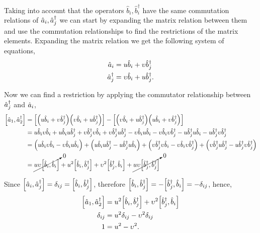 \documentclass[../main.tex]{subfiles}
\begin{document}
Taking into account that the operators $\hat{b}_i, \hat{b}^\dagger_i$ have the same commutation relations of $\hat{a}_i,\hat{a}^\dagger_j$ we can start by expanding the matrix relation between them and use the commutation relationships to find the restrictions of the matrix elements.
Expanding the matrix relation we get the following system of equations,
\begin{align*}
    \hat{a}_i &= u\hat{b}_i + \upsilon\hat{b}^\dagger_j \\
    \hat{a}^\dagger_j &= \upsilon\hat{b}_i + u\hat{b}^\dagger_j .
\end{align*}

Now we can find a restriction by applying the commutator relationship between $\hat{a}^\dagger_j$ and $\hat{a}_i$,
\begin{align*}
    \commutator{\hata_1}{\hatad_2} &=  \qty[\qty(u\hat{b}_i + \upsilon\hat{b}^\dagger_j)\qty(\upsilon\hat{b}_i + u\hat{b}^\dagger_j)] - \qty[\qty(\upsilon\hat{b}_i + u\hat{b}^\dagger_j)\qty(u\hat{b}_i + \upsilon\hat{b}^\dagger_j)] \\
    &=  u\hat{b}_i\upsilon\hat{b}_i
        +u\hat{b}_iu\hat{b}^\dagger_j
        +\upsilon\hat{b}^\dagger_j\upsilon\hat{b}_i
        +\upsilon\hat{b}^\dagger_ju\hat{b}^\dagger_j
        -\upsilon\hat{b}_iu\hat{b}_i
        -\upsilon\hat{b}_i\upsilon\hat{b}^\dagger_j
        -u\hat{b}^\dagger_ju\hat{b}_i
        -u\hat{b}^\dagger_j\upsilon\hat{b}^\dagger_j \\
    &=  \qty(u\hat{b}_i\upsilon\hat{b}_i-\upsilon\hat{b}_iu\hat{b}_i)
        +\qty(u\hat{b}_iu\hat{b}^\dagger_j-u\hat{b}^\dagger_ju\hat{b}_i)
        +\qty(\upsilon\hat{b}^\dagger_j\upsilon\hat{b}_i-\upsilon\hat{b}_i\upsilon\hat{b}^\dagger_j)
       +\qty(\upsilon\hat{b}^\dagger_ju\hat{b}^\dagger_j -u\hat{b}^\dagger_j\upsilon\hat{b}^\dagger_j) \\
    &=  \cancelto{0}{u\upsilon\commutator{\hat{b}_i}{\hat{b}_i}}
        +u^2\commutator{\hat{b}_i}{\hat{b}^\dagger_j}
        +\upsilon^2\commutator{\hat{b}^\dagger_j}{\hat{b}_i}
        +\cancelto{0}{u\upsilon\commutator{\hat{b}^\dagger_j}{\hat{b}^\dagger_j}}
\end{align*}

Since $\commutator{\hata_i}{\hatad_j}=\delta_{ij}=\commutator{\hat{b}_i}{\hat{b}^\dagger_j}$, therefore $\commutator{\hat{b}_i}{\hat{b}^\dagger_j}=-\commutator{\hat{b}^\dagger_j}{\hat{b}_i}=-\delta_{ij}$, hence,
\begin{align*}
    \commutator{\hata_1}{\hatad_2} &= u^2\commutator{\hat{b}_i}{\hat{b}^\dagger_j} +\upsilon^2\commutator{\hat{b}^\dagger_j}{\hat{b}_i} \\
                       \delta_{ij} &= u^2\delta_{ij} - \upsilon^2\delta_{ij} \\
                       1 &= u^2 - \upsilon^2.
\end{align*}
\end{document}

